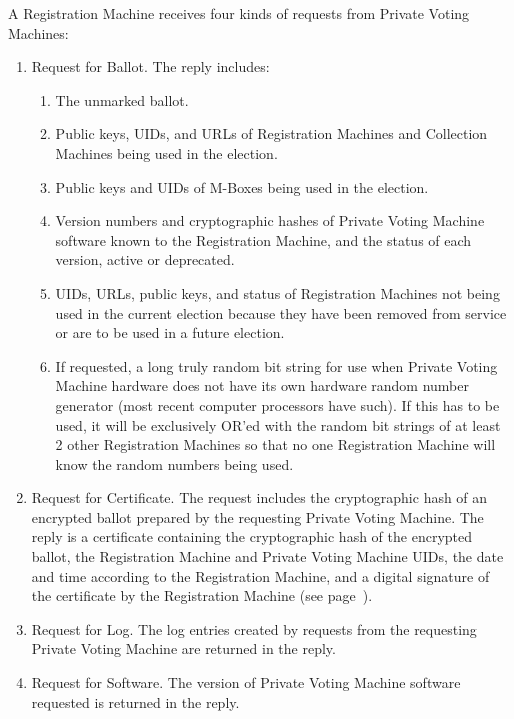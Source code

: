 \documentclass[12pt]{article}
\newcommand{\pagref}[1]{(see page~\pageref{#1})}
\begin{document}
A Registration Machine receives four kinds of requests from
Private Voting Machines:
\begin{enumerate}

\item
Request for Ballot.  The reply includes:
\begin{enumerate}
\item The unmarked ballot.
\item Public keys, UIDs, and URLs
      of Registration Machines and Collection Machines being used
      in the election.
\item Public keys and UIDs of M-Boxes being used in the election.
\item Version numbers and cryptographic hashes
      of Private Voting Machine software
      known to the Registration Machine, and
      the status of each version, active or deprecated.
\item UIDs, URLs, public keys, and status of Registration Machines not
      being used in the current election because they have been removed
      from service or are to be used in a future election.
\item If requested, a long truly random bit string for use when
      Private Voting Machine hardware does not have its own hardware
      random number generator (most recent computer processors have
      such).  If this has to be used, it will be exclusively OR'ed with
      the random bit strings of at least 2 other Registration Machines
      so that no one Registration Machine will know the random numbers being
      used.
\end{enumerate}

\item
Request for Certificate.  The request includes the cryptographic hash
of an encrypted ballot prepared by the requesting Private
Voting Machine.  The reply is a certificate containing
the cryptographic hash of the encrypted ballot,
the Registration Machine and Private Voting Machine UIDs,
the date and time according to the Registration Machine,
and a digital signature of the certificate by the Registration Machine
\pagref{CERTIFICATE-DETAILS}.

\item
Request for Log.  The log entries created by requests from the
requesting Private Voting Machine are returned in the reply.

\item
Request for Software.  The version of Private Voting Machine software
requested is returned in the reply.

\end{enumerate}
\end{document}
